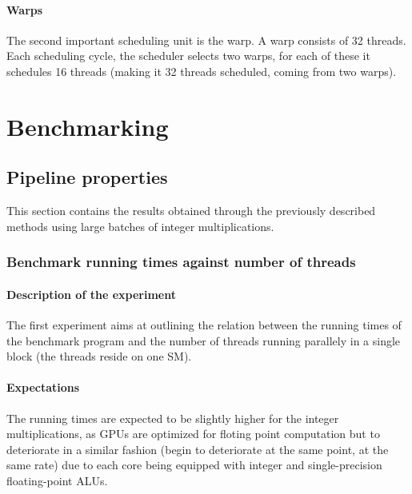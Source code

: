 \documentclass{report}
\begin{document}
        \subsubsection{Warps}
        The second important scheduling unit is the warp. A warp consists
        of 32 threads. Each scheduling cycle, the scheduler selects two
        warps, for each of these it schedules 16 threads (making it 32
        threads scheduled, coming from two warps).

\chapter{Benchmarking		}
\section{Pipeline properties}
	This section contains the results obtained through the previously described
	methods using large batches of integer multiplications.

	\subsection{Benchmark running times against number of threads}
	\label{par:pipeline_exp}
	\subsubsection{Description of the experiment}
	The first experiment aims at outlining the relation between the running
    times of the benchmark program and the number of threads running parallely in
    a single block (the threads reside on one SM).
	\subsubsection{Expectations}
    The running times are expected to be slightly higher for the integer
    multiplications, as GPUs are optimized for floting point computation
    but to deteriorate in a similar fashion (begin to deteriorate
    at the same point, at the same rate) due to each core being equipped with
    integer and single-precision floating-point ALUs.
    
\end{document}
